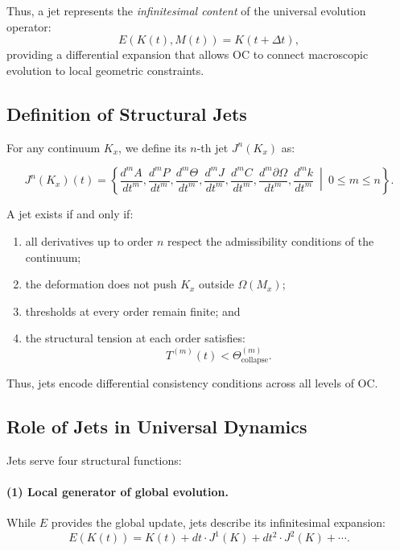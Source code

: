 Thus, a jet represents the \emph{infinitesimal content} of the universal
evolution operator:
\[
E(K(t), M(t)) = K(t+\Delta t),
\]
providing a differential expansion that allows OC to connect macroscopic
evolution to local geometric constraints.



\subsection{Definition of Structural Jets}

For any continuum $K_x$, we define its $n$-th jet $J^n(K_x)$ as:

\begin{equation}
J^n(K_x)(t) = 
\left\{
\frac{d^m A}{dt^m},
\frac{d^m P}{dt^m},
\frac{d^m \Theta}{dt^m},
\frac{d^m J}{dt^m},
\frac{d^m C}{dt^m},
\frac{d^m \partial\Omega}{dt^m},
\frac{d^m k}{dt^m}
\ \middle|\ 
0 \le m \le n
\right\}.
\end{equation}

A jet exists if and only if:

\begin{enumerate}
    \item all derivatives up to order $n$ respect the admissibility
    conditions of the continuum;
    \item the deformation does not push $K_x$ outside $\Omega(M_x)$;
    \item thresholds at every order remain finite; and
    \item the structural tension at each order satisfies:
    \[
        T^{(m)}(t) < \Theta_{\mathrm{collapse}}^{(m)}.
    \]
\end{enumerate}

Thus, jets encode differential consistency conditions across all levels
of OC.



\subsection{Role of Jets in Universal Dynamics}

Jets serve four structural functions:

\paragraph{(1) Local generator of global evolution.}
While $E$ provides the global update, jets describe its infinitesimal
expansion:
\[
E(K(t)) = K(t) + dt \cdot J^1(K) + dt^2 \cdot J^2(K) + \cdots.
\]

